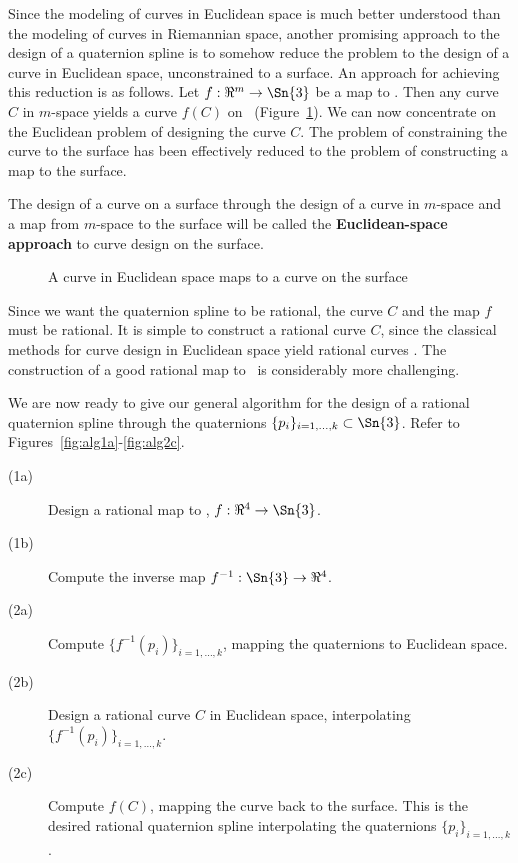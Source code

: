 Since the modeling of curves in Euclidean space
is much better understood than the modeling of curves in Riemannian space, 
another promising approach to the
design of a quaternion spline is to somehow reduce the problem to the 
design of a curve in Euclidean space, unconstrained to a surface.
An approach for achieving this reduction is as follows.
Let $f:\Re^m \rightarrow \Sn{3}$ be a map to .
Then any curve $C$ in $m$-space yields a curve $f(C)$ on \ 
(Figure~\ref{fig:reduce}).
We can now concentrate on the Euclidean problem of designing the curve $C$.
The problem of constraining the curve to the surface has been
effectively reduced to the problem of constructing a map to the surface.

\begin{defn2}
The design of a curve on a surface through the design of a curve in $m$-space
and a map from $m$-space to the surface will be called the {\bf Euclidean-space
approach} to curve design on the surface.
\end{defn2}
\begin{figure}
\vspace{2.5in}
\caption{A curve in Euclidean space maps to a curve on the surface}
\label{fig:reduce}
\end{figure}

Since we want the quaternion spline to be rational,
the curve $C$ and the map $f$ must be rational.
It is simple to construct a rational curve $C$,
since the classical methods for curve design in Euclidean space yield 
rational curves \cite{farin97}.
The construction of a good rational map to \ is considerably
more challenging.

We are now ready to give our general algorithm for the design of a rational
quaternion spline through the quaternions
$\{p_i\}_{i=1,\ldots,k} \subset \Sn{3}$.
Refer to Figures~\ref{fig:alg1a}-\ref{fig:alg2c}.
%
\begin{description}
\item[(1a)] Design a rational map to , $f:\Re^4 \rightarrow \Sn{3}$.
\item[(1b)] Compute the inverse map $f^{-1}:\Sn{3} \rightarrow \Re^4$.
\item[(2a)] Compute $\{f^{-1}(p_i)\}_{i=1,\ldots,k}$, 
	    mapping the quaternions to Euclidean space.
\item[(2b)] Design a rational curve $C$ in Euclidean space, interpolating $\{f^{-1}(p_i)\}_{i=1,\ldots,k}$.
\item[(2c)] Compute $f(C)$, mapping the curve back to the surface.
	    This is the desired rational quaternion spline interpolating
	    the quaternions $\{p_i\}_{i=1,\ldots,k}$.
\end{description}

